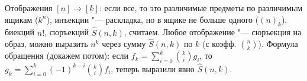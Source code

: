 Отображения $[n] \to [k]$: если все, то это различимые предметы по различимым ящикам ($k^n$),
инъекции "--- раскладка, но в ящике не больше одного ($(n)_k$), биекций $n!$, сюръекций $\hat S(n, k)$, считаем.
Любое отображение "--- сюръекция на образ, можно выразить $n^k$ через сумму $\hat S(n, k)$ по $k$
(с коэфф. $\binom{n}{k}$).
Формула обращения (докажем потом): если $f_k=\sum_{i=0}^k \binom{k}{i} g_i$, то $g_k=\sum_{i=0}^k (-1)^{k-i} \binom{k}{i} f_i$,
теперь выразили явно $\hat S(n, k)$.

\section{} %
